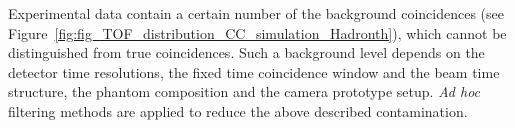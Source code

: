 
Experimental data contain a certain number of the background coincidences (see Figure~\ref{fig:fig_TOF_distribution_CC_simulation_Hadronth}), which cannot be distinguished from true coincidences. Such a background level depends on the detector time resolutions, the fixed time coincidence window and the beam time structure, the phantom composition and the camera prototype setup.
\textit{Ad hoc} filtering methods are applied to reduce the above described contamination.

